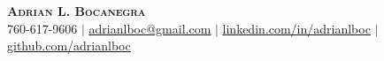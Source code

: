 \begin{center}
    \textbf{\Huge \scshape Adrian L. Bocanegra} \\ \vspace{5pt}
    \small 760-617-9606 $|$ \href{mailto:adrianlboc@gmail.com}{\underline{adrianlboc@gmail.com}} $|$ 
    \href{https://www.linkedin.com/in/adrianlboc/}{\underline{linkedin.com/in/adrianlboc}} $|$
    \href{https://github.com/adrianlboc}{\underline{github.com/adrianlboc}}
    \\ \vspace{1pt}
\end{center}